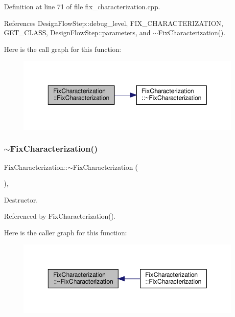 Definition at line 71 of file fix\+\_\+characterization.\+cpp.



References Design\+Flow\+Step\+::debug\+\_\+level, F\+I\+X\+\_\+\+C\+H\+A\+R\+A\+C\+T\+E\+R\+I\+Z\+A\+T\+I\+ON, G\+E\+T\+\_\+\+C\+L\+A\+SS, Design\+Flow\+Step\+::parameters, and $\sim$\+Fix\+Characterization().

Here is the call graph for this function\+:
\nopagebreak
\begin{figure}[H]
\begin{center}
\leavevmode
\includegraphics[width=336pt]{d9/dc5/classFixCharacterization_a4e029966461122b6b8d6d0cc25db66fc_cgraph}
\end{center}
\end{figure}
\mbox{\label{classFixCharacterization_aa5fbb89c33ae94a9c51600e510e7a312}} 
\subsubsection{\texorpdfstring{$\sim$\+Fix\+Characterization()}{~FixCharacterization()}}
{\footnotesize\ttfamily Fix\+Characterization\+::$\sim$\+Fix\+Characterization (\begin{DoxyParamCaption}{ }\end{DoxyParamCaption})\hspace{0.3cm}{\ttfamily [override]}, {\ttfamily [default]}}



Destructor. 



Referenced by Fix\+Characterization().

Here is the caller graph for this function\+:
\nopagebreak
\begin{figure}[H]
\begin{center}
\leavevmode
\includegraphics[width=336pt]{d9/dc5/classFixCharacterization_aa5fbb89c33ae94a9c51600e510e7a312_icgraph}
\end{center}
\end{figure}


